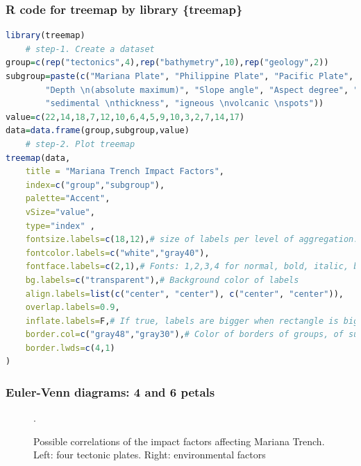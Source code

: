\documentclass[pdflatex,compress,10pt,
	xcolor={dvipsnames,dvipsnames,svgnames,x11names,table},
	hyperref={colorlinks = true,breaklinks = true, urlcolor = NavyBlue, breaklinks = true}]{beamer}
\begin{document}
\begin{frame}[fragile]\frametitle{R code for treemap by library \{treemap\}}
\begin{lstlisting}[language=R]
library(treemap)
	# step-1. Create a dataset
group=c(rep("tectonics",4),rep("bathymetry",10),rep("geology",2))
subgroup=paste(c("Mariana Plate", "Philippine Plate", "Pacific Plate", "Caroline Plate", 
		"Depth \n(absolute maximum)", "Slope angle", "Aspect degree", "Depth (Mean)", "Depth (Median)", "Aspect class", "Steepness class", "Depth \n(1 quart.)", "Depth \n(3 quart.)", "tg angle", 
		"sedimental \nthickness", "igneous \nvolcanic \nspots"))
value=c(22,14,18,7,12,10,6,4,5,9,10,3,2,7,14,17)
data=data.frame(group,subgroup,value)
	# step-2. Plot treemap
treemap(data,
	title = "Mariana Trench Impact Factors",
	index=c("group","subgroup"),
	palette="Accent",
	vSize="value",
	type="index" ,
	fontsize.labels=c(18,12),# size of labels per level of aggregation: group, subgroup, subsubgroups
	fontcolor.labels=c("white","gray40"),
	fontface.labels=c(2,1),# Fonts: 1,2,3,4 for normal, bold, italic, bold-italic
	bg.labels=c("transparent"),# Background color of labels
	align.labels=list(c("center", "center"), c("center", "center")),
	overlap.labels=0.9,
	inflate.labels=F,# If true, labels are bigger when rectangle is bigger.
	border.col=c("gray48","gray30"),# Color of borders of groups, of subgroups
	border.lwds=c(4,1)
)
\end{lstlisting}
\end{frame}

\begin{frame}\frametitle{Euler-Venn diagrams: 4 and 6 petals}
\begin{figure}[H]
	\centering
			\hspace{3mm}
			\hspace{3mm}
	\caption{Possible correlations of the impact factors affecting Mariana Trench. \\Left: four tectonic plates. Right: environmental factors}.
\end{figure}
\end{frame}
\end{document}
